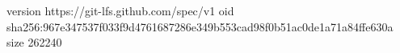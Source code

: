 version https://git-lfs.github.com/spec/v1
oid sha256:967e347537f033f9d4761687286e349b553cad98f0b51ac0de1a71a84ffe630a
size 262240

